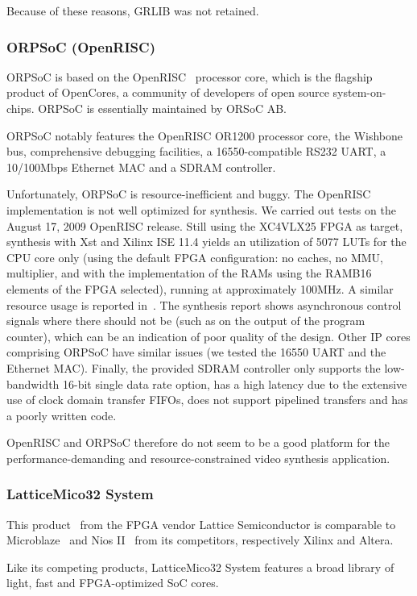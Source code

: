 \documentclass[a4paper,11pt]{kthesis}
\begin{document}
Because of these reasons, GRLIB was not retained.

\subsubsection{ORPSoC (OpenRISC)}
ORPSoC is based on the OpenRISC~\cite{openrisc} processor core, which is the flagship product of OpenCores, a community of developers of open source system-on-chips. ORPSoC is essentially maintained by ORSoC AB.

ORPSoC notably features the OpenRISC OR1200 processor core, the Wishbone~\cite{wishbone} bus, comprehensive debugging facilities, a 16550-compatible RS232 UART, a 10/100Mbps Ethernet MAC and a SDRAM controller.

Unfortunately, ORPSoC is resource-inefficient and buggy. The OpenRISC implementation is not well optimized for synthesis. We carried out tests on the August 17, 2009 OpenRISC release. Still using the XC4VLX25 FPGA as target, synthesis with Xst and Xilinx ISE 11.4 yields an utilization of 5077 LUTs for the CPU core only (using the default FPGA configuration: no caches, no MMU, multiplier, and with the implementation of the RAMs using the RAMB16 elements of the FPGA selected), running at approximately 100MHz. A similar resource usage is reported in~\cite{softcorecomp}. The synthesis report shows asynchronous control signals where there should not be (such as on the output of the program counter), which can be an indication of poor quality of the design. Other IP cores comprising ORPSoC have similar issues (we tested the 16550 UART and the Ethernet MAC). Finally, the provided SDRAM controller only supports the low-bandwidth 16-bit single data rate option, has a high latency due to the extensive use of clock domain transfer FIFOs, does not support pipelined transfers and has a poorly written code.

OpenRISC and ORPSoC therefore do not seem to be a good platform for the performance-demanding and resource-constrained video synthesis application.

\subsubsection{LatticeMico32 System}
This product~\cite{mico32} from the FPGA vendor Lattice Semiconductor is comparable to Microblaze~\cite{microblaze} and Nios II~\cite{nios} from its competitors, respectively Xilinx and Altera.

Like its competing products, LatticeMico32 System features a broad library of light, fast and FPGA-optimized SoC cores.
\end{document}
